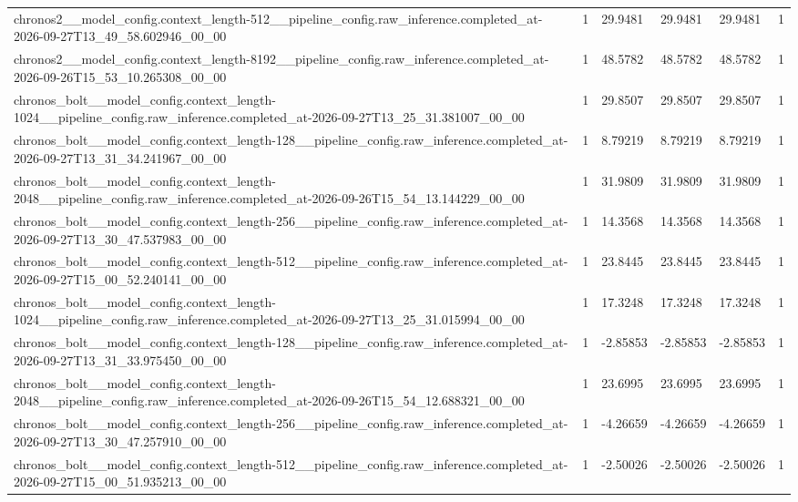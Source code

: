 \begin{tabular}{llllll}
chronos2\_\_model\_config.context\_length-512\_\_pipeline\_config.raw\_inference.completed\_at-2026-09-27T13\_49\_58.602946\_00\_00 & 1 & 29.9481 & 29.9481 & 29.9481 & 1 \\
chronos2\_\_model\_config.context\_length-8192\_\_pipeline\_config.raw\_inference.completed\_at-2026-09-26T15\_53\_10.265308\_00\_00 & 1 & 48.5782 & 48.5782 & 48.5782 & 1 \\
chronos\_bolt\_\_model\_config.context\_length-1024\_\_pipeline\_config.raw\_inference.completed\_at-2026-09-27T13\_25\_31.381007\_00\_00 & 1 & 29.8507 & 29.8507 & 29.8507 & 1 \\
chronos\_bolt\_\_model\_config.context\_length-128\_\_pipeline\_config.raw\_inference.completed\_at-2026-09-27T13\_31\_34.241967\_00\_00 & 1 & 8.79219 & 8.79219 & 8.79219 & 1 \\
chronos\_bolt\_\_model\_config.context\_length-2048\_\_pipeline\_config.raw\_inference.completed\_at-2026-09-26T15\_54\_13.144229\_00\_00 & 1 & 31.9809 & 31.9809 & 31.9809 & 1 \\
chronos\_bolt\_\_model\_config.context\_length-256\_\_pipeline\_config.raw\_inference.completed\_at-2026-09-27T13\_30\_47.537983\_00\_00 & 1 & 14.3568 & 14.3568 & 14.3568 & 1 \\
chronos\_bolt\_\_model\_config.context\_length-512\_\_pipeline\_config.raw\_inference.completed\_at-2026-09-27T15\_00\_52.240141\_00\_00 & 1 & 23.8445 & 23.8445 & 23.8445 & 1 \\
chronos\_bolt\_\_model\_config.context\_length-1024\_\_pipeline\_config.raw\_inference.completed\_at-2026-09-27T13\_25\_31.015994\_00\_00 & 1 & 17.3248 & 17.3248 & 17.3248 & 1 \\
chronos\_bolt\_\_model\_config.context\_length-128\_\_pipeline\_config.raw\_inference.completed\_at-2026-09-27T13\_31\_33.975450\_00\_00 & 1 & -2.85853 & -2.85853 & -2.85853 & 1 \\
chronos\_bolt\_\_model\_config.context\_length-2048\_\_pipeline\_config.raw\_inference.completed\_at-2026-09-26T15\_54\_12.688321\_00\_00 & 1 & 23.6995 & 23.6995 & 23.6995 & 1 \\
chronos\_bolt\_\_model\_config.context\_length-256\_\_pipeline\_config.raw\_inference.completed\_at-2026-09-27T13\_30\_47.257910\_00\_00 & 1 & -4.26659 & -4.26659 & -4.26659 & 1 \\
chronos\_bolt\_\_model\_config.context\_length-512\_\_pipeline\_config.raw\_inference.completed\_at-2026-09-27T15\_00\_51.935213\_00\_00 & 1 & -2.50026 & -2.50026 & -2.50026 & 1 \\

\end{tabular}
